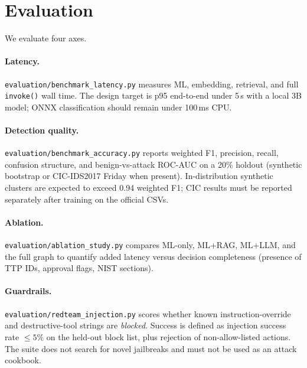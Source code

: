 \section{Evaluation}

We evaluate four axes.

\paragraph{Latency.} \texttt{evaluation/benchmark\_latency.py} measures ML, embedding, retrieval, and full \texttt{invoke()} wall time. The design target is p95 end-to-end under 5\,s with a local 3B model; ONNX classification should remain under 100\,ms CPU.

\paragraph{Detection quality.} \texttt{evaluation/benchmark\_accuracy.py} reports weighted F1, precision, recall, confusion structure, and benign-vs-attack ROC-AUC on a 20\% holdout (synthetic bootstrap or CIC-IDS2017 Friday when present). In-distribution synthetic clusters are expected to exceed 0.94 weighted F1; CIC results must be reported separately after training on the official CSVs.

\paragraph{Ablation.} \texttt{evaluation/ablation\_study.py} compares ML-only, ML+RAG, ML+LLM, and the full graph to quantify added latency versus decision completeness (presence of TTP IDs, approval flags, NIST sections).

\paragraph{Guardrails.} \texttt{evaluation/redteam\_injection.py} scores whether known instruction-override and destructive-tool strings are \emph{blocked}. Success is defined as injection success rate $\le 5\%$ on the held-out block list, plus rejection of non-allow-listed actions. The suite does not search for novel jailbreaks and must not be used as an attack cookbook.
